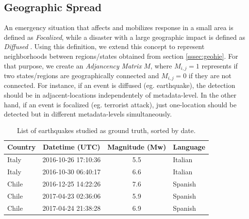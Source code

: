 \documentclass[sigconf]{acmart}
\begin{document}

\subsection{Geographic Spread}\label{sssec:geospread}

An emergency situation that affects and mobilizes response in a small area is defined as \textit{Focalized}, while a disaster with a large geographic impact is defined as \textit{Diffused} \cite{olteanu2015expect}. Using this definition, we extend this concept to represent neighborhoods between regions/states obtained from section \ref{sssec:geohie}. For that purpose, we create an \textit{Adjancency Matrix} $M$, where $M_{i,j} = 1$ represents if two states/regions are geographically connected and $M_{i,j} = 0$ if they are not connected. For instance, if an event is diffused (eg. earthquake), the detection should be in adjacent-locations independentely of metadata-level. In the other hand, if an event is focalized (eg. terrorist attack), just one-location should be detected but in different metadata-levels simultaneously.


\begin{table}
	\caption{List of earthquakes studied as ground truth, sorted by date.}
	\label{tab:eqs}
	\begin{tabular}{lccl}
		\toprule
		Country&Datetime (UTC)&Magnitude (Mw)& Language\\
		\midrule
		Italy & 2016-10-26 17:10:36 & 5.5 & Italian \\
		Italy & 2016-10-30 06:40:17 & 6.6 & Italian\\
		Chile & 2016-12-25 14:22:26 & 7.6 & Spanish\\
		Chile & 2017-04-23 02:36:06 & 5.9 & Spanish\\
		Chile & 2017-04-24 21:38:28 & 6.9 & Spanish\\
		\midrule
	\end{tabular}
\end{table}
\end{document}
